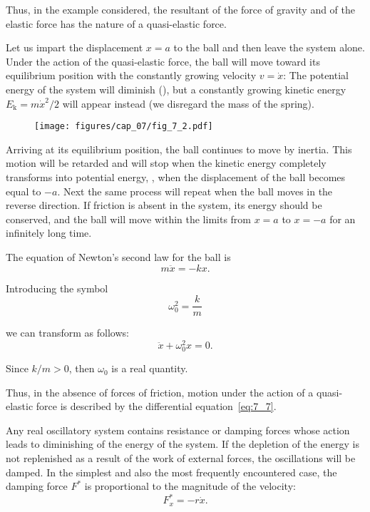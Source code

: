 \noindent
Thus, in the example considered, the resultant of the force of gravity and of the elastic force has the nature of a quasi-elastic force.

Let us impart the displacement $x=a$ to the ball and then leave the system alone. Under the action of the quasi-elastic force, the ball will move toward its equilibrium position with the constantly growing velocity $v=\dot{x}$: The potential energy of the system will diminish (), but a constantly growing kinetic energy $E_{\text{k}}=m\dot{x}^2/2$ will appear instead (we disregard the mass of the spring).

\begin{figure}[t]
	\begin{center}
		\texttt{[image: figures/cap\_07/fig\_7\_2.pdf]}
		\caption[]{}
		\label{fig:7_2}
	\end{center}
	\vspace{-0.7cm}
\end{figure}

Arriving at its equilibrium position, the ball continues to move by inertia. This motion will be retarded and will stop when the kinetic energy completely transforms into potential energy, \ie, when the displacement of the ball becomes equal to $-a$. Next the same process will repeat when the ball moves in the reverse direction. If friction is absent in the system, its energy should be conserved, and the ball will move within the limits from $x=a$ to $x=-a$ for an infinitely long time.

The equation of Newton's second law for the ball is
\begin{equation}\label{eq:7_5}
	m\ddot{x} = -kx.
\end{equation}

\noindent
Introducing the symbol
\begin{equation}\label{eq:7_6}
	\omega_0^2 = \frac{k}{m}
\end{equation}

\noindent
we can transform  as follows:
\begin{equation}\label{eq:7_7}
	\ddot{x} + \omega_0^2 x = 0.
\end{equation}

\noindent
Since $k/m>0$, then $\omega_0$ is a real quantity.

Thus, in the absence of forces of friction, motion under the action of a quasi-elastic force is described by the differential equation~\eqref{eq:7_7}.

Any real oscillatory system contains resistance or damping forces whose action leads to diminishing of the energy of the system. If the depletion of the energy is not replenished as a result of the work of external forces, the oscillations will be damped. In the simplest and also the most frequently encountered case, the damping force $F^*$ is proportional to the magnitude of the velocity:
\begin{equation}\label{eq:7_8}
	F_x^* = -r\dot{x}.
\end{equation}

